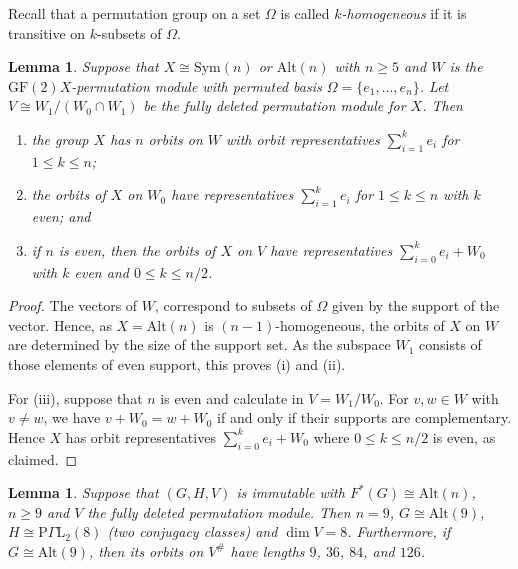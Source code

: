 \documentclass[12pt]{amsart}
\newtheorem{lemma}[theorem]{Lemma}
\theoremstyle{remark}
\theoremstyle{notation}
\theoremstyle{definition}
\newcommand{\GF}{\mathrm{GF}}
\newcommand{\0}{\emptyset}
\newcommand{\Sym}{\mathrm{Sym}}
\newcommand{\Alt}{\mathrm{Alt}}
\begin{document}
Recall that a permutation group on a set $\Omega$ is called \emph{$k$-homogeneous} if it is transitive on $k$-subsets of $\Omega$.
\begin{lemma}\label{lem:Orbs del mod} Suppose that $X \cong \Sym(n)$ or $\Alt(n)$ with $n \ge 5$ and $W$ is the $\GF(2)X$-permutation module  with permuted basis $\Omega=\{e_1, \dots, e_n\}$. Let $V \cong W_1/(W_0\cap W_1)$ be the fully deleted permutation module for $X$. Then
\begin{enumerate}
\item the group $X$ has $n$ orbits on  $W$ with orbit representatives $\sum_{i=1}^ke_i$ for $1 \le k \le n$;
\item the orbits of $X$ on $W_0$ have representatives   $\sum_{i=1}^ke_i$ for $1 \le k \le n$ with $k$ even; and
\item if $n$ is even, then the orbits of $X$ on $V$  have representatives $\sum_{i=0}^{k} e_i+W_0$ with $k$ even and $0\le k \le n/2$.
\end{enumerate}
\end{lemma}

\begin{proof}  The vectors of $W$, correspond to subsets of $\Omega$ given by the support of the vector.  Hence, as $X=\Alt(n)$ is $(n-1)$-homogeneous,   the orbits of $X$ on $W$ are determined by the size of the support set. As the subspace $W_1$ consists of those elements of even support, this proves (i) and (ii).


For (iii), suppose that $n$ is even and calculate in $V=W_1/W_0$. For $v,w \in W$ with $v \ne w$, we have $v+W_0= w+ W_0$ if and only if their supports are complementary.  Hence $X$ has orbit representatives $\sum_{i=0}^{k} e_i+W_0$ where $0\le k \le n/2$ is even, as claimed. \end{proof}




\begin{lemma}\label{lem:full deleted}
Suppose that $( G,H,V)$ is   immutable  with $F^*(G) \cong \Alt(n)$, $n \ge 9$ and $V$ the fully deleted permutation module. Then
 $n=9$, $G \cong \Alt(9)$,   $H\cong \mathrm P\Gamma\mathrm L_2(8)$ (two conjugacy classes) and $\dim V=8$. Furthermore, if $G\cong \Alt(9)$, then its orbits on $V^\#$ have lengths  $9$, $36$, $84$, and $126$.
\end{lemma}
\end{document}
